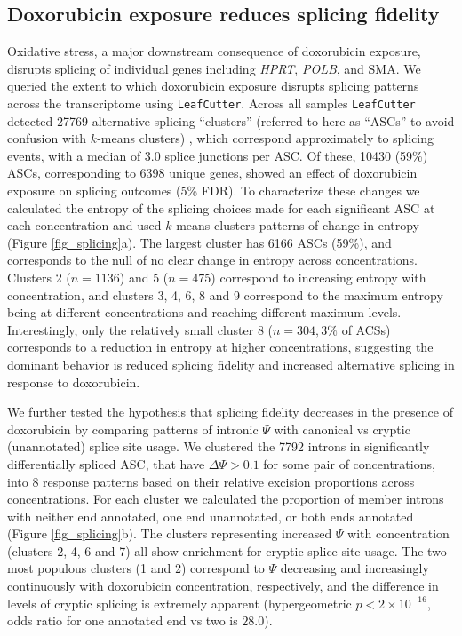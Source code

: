 \documentclass{article}
\begin{document}
\subsection*{Doxorubicin exposure reduces splicing fidelity}


Oxidative stress, a major downstream consequence of doxorubicin exposure, disrupts splicing of individual genes including \emph{HPRT}, \emph{POLB}\cite{Disher2007}, and SMA\cite{Seo2016}. We queried the extent to which doxorubicin exposure disrupts splicing patterns across the transcriptome using \texttt{LeafCutter}\cite{LeafCutter}. Across all samples \texttt{LeafCutter} detected 27769 alternative splicing ``clusters'' (referred to here as ``ASCs'' to avoid confusion with $k$-means clusters) , which correspond approximately to splicing events, with a median of 3.0 splice junctions per ASC. Of these, 10430 (59\%) ASCs, corresponding to 6398 unique genes, showed an effect of doxorubicin exposure on splicing outcomes (5\% FDR). To characterize these changes we calculated the entropy of the splicing choices made for each significant ASC at each concentration and used $k$-means clusters patterns of change in entropy (Figure \ref{fig_splicing}a). The largest cluster has 6166 ASCs (59\%), and corresponds to the null of no clear change in entropy across concentrations. Clusters 2 ($n=1136$) and 5 ($n=475$) correspond to increasing entropy with concentration, and clusters 3, 4, 6, 8 and 9 correspond to the maximum entropy being at different concentrations and reaching different maximum levels. Interestingly, only the relatively small cluster 8 ($n=304, 3\%$ of ACSs) corresponds to a reduction in entropy at higher  concentrations, suggesting the dominant behavior is reduced splicing fidelity and increased alternative splicing in response to doxorubicin. 

We further tested the hypothesis that splicing fidelity decreases in the presence of doxorubicin by comparing patterns of intronic $\Psi$ with canonical vs cryptic (unannotated) splice site usage. We clustered the 7792 introns in significantly differentially spliced ASC, that have $\Delta \Psi > 0.1$ for some pair of concentrations, into 8 response patterns based on their relative excision proportions across concentrations. For each cluster we calculated the proportion of member introns with neither end annotated, one end unannotated, or both ends annotated (Figure \ref{fig_splicing}b). The clusters representing increased $\Psi$ with concentration (clusters 2, 4, 6 and 7) all show enrichment for cryptic splice site usage. The two most populous clusters (1 and 2) correspond to $\Psi$ decreasing and increasingly continuously with doxorubicin concentration, respectively, and the difference in levels of cryptic splicing is extremely apparent (hypergeometric $p < 2 \times 10^{-16}$, odds ratio for one annotated end vs two is $28.0$).
\end{document}

